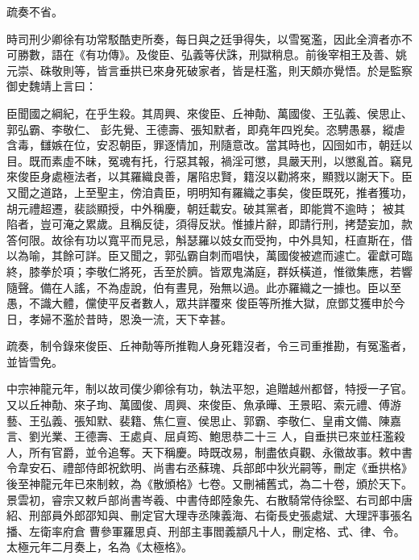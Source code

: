 \begin{pinyinscope}
 疏奏不省。



 時司刑少卿徐有功常駁酷吏所奏，每日與之廷爭得失，以雪冤濫，因此全濟者亦不可勝數，語在《有功傳》。及俊臣、弘義等伏誅，刑獄稍息。前後宰相王及善、姚元崇、硃敬則等，皆言垂拱已來身死破家者，皆是枉濫，則天頗亦覺悟。於是監察御史魏靖上言曰：



 臣聞國之綱紀，在乎生殺。其周興、來俊臣、丘神勣、萬國俊、王弘義、侯思止、郭弘霸、李敬仁、
 彭先覺、王德壽、張知默者，即堯年四兇矣。恣騁愚暴，縱虐含毒，讎嫉在位，安忍朝臣，罪逐情加，刑隨意改。當其時也，囚囹如市，朝廷以目。既而素虛不昧，冤魂有托，行惡其報，禍淫可懲，具嚴天刑，以懲亂首。竊見來俊臣身處極法者，以其羅織良善，屠陷忠賢，籍沒以勸將來，顯戮以謝天下。臣又聞之道路，上至聖主，傍洎貴臣，明明知有羅織之事矣，俊臣既死，推者獲功，胡元禮超遷，裴談顯授，中外稱慶，朝廷載安。破其黨者，即能賞不逾時；
 被其陷者，豈可淹之累歲。且稱反徒，須得反狀。惟據片辭，即請行刑，拷楚妄加，款答何限。故徐有功以寬平而見忌，斛瑟羅以妓女而受拘，中外具知，枉直斯在，借以為喻，其餘可詳。臣又聞之，郭弘霸自刺而唱快，萬國俊被遮而遽亡。霍獻可臨終，膝拳於項；李敬仁將死，舌至於臍。皆眾鬼滿庭，群妖橫道，惟徵集應，若響隨聲。備在人謠，不為虛說，伯有晝見，殆無以過。此亦羅織之一據也。臣以至愚，不識大體，儻使平反者數人，眾共詳覆來
 俊臣等所推大獄，庶鄧艾獲申於今日，孝婦不濫於昔時，恩渙一流，天下幸甚。



 疏奏，制令錄來俊臣、丘神勣等所推鞫人身死籍沒者，令三司重推勘，有冤濫者，並皆雪免。



 中宗神龍元年，制以故司僕少卿徐有功，執法平恕，追贈越州都督，特授一子官。又以丘神勣、來子珣、萬國俊、周興、來俊臣、魚承曄、王景昭、索元禮、傅游藝、王弘義、張知默、裴籍、焦仁亶、侯思止、郭霸、李敬仁、皇甫文備、陳嘉言、劉光業、王德壽、王處貞、屈貞筠、鮑思恭二十三
 人，自垂拱已來並枉濫殺人，所有官爵，並令追奪。天下稱慶。時既改易，制盡依貞觀、永徽故事。敕中書令韋安石、禮部侍郎祝欽明、尚書右丞蘇瑰、兵部郎中狄光嗣等，刪定《垂拱格》後至神龍元年已來制敕，為《散頒格》七卷。又刪補舊式，為二十卷，頒於天下。景雲初，睿宗又敕戶部尚書岑羲、中書侍郎陸象先、右散騎常侍徐堅、右司郎中唐紹、刑部員外郎邵知與、刪定官大理寺丞陳義海、右衛長史張處斌、大理評事張名播、左衛率府倉
 曹參軍羅思貞、刑部主事閻義顓凡十人，刪定格、式、律、令。太極元年二月奏上，名為《太極格》。




\end{pinyinscope}

